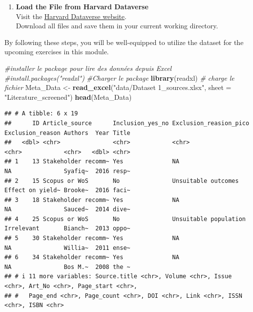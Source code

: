 \documentclass[
]{book}
\newenvironment{Shaded}{\begin{snugshade}}{\end{snugshade}}
\newcommand{\AttributeTok}[1]{\textcolor[rgb]{0.13,0.29,0.53}{#1}}
\newcommand{\CommentTok}[1]{\textcolor[rgb]{0.56,0.35,0.01}{\textit{#1}}}
\newcommand{\FunctionTok}[1]{\textcolor[rgb]{0.13,0.29,0.53}{\textbf{#1}}}
\newcommand{\NormalTok}[1]{#1}
\newcommand{\OtherTok}[1]{\textcolor[rgb]{0.56,0.35,0.01}{#1}}
\newcommand{\StringTok}[1]{\textcolor[rgb]{0.31,0.60,0.02}{#1}}
\providecommand{\tightlist}{%
  \setlength{\itemsep}{0pt}\setlength{\parskip}{0pt}}
\begin{document}
\begin{enumerate}
\def\labelenumi{\arabic{enumi}.}
\tightlist
\item
  \textbf{Load the File from Harvard Dataverse}\\
  Visit the \href{https://dataverse.harvard.edu/dataset.xhtml?persistentId=doi:10.7910/DVN/XIDI1X}{Harvard Dataverse website}.\\
  Download all files and save them in your current working directory.
\end{enumerate}

By following these steps, you will be well-equipped to utilize the dataset for the upcoming exercises in this module.\\

\begin{Shaded}
\begin{Highlighting}[]
\CommentTok{\#installer le package pour lire des données depuis Excel}
\CommentTok{\#install.packages("readxl")}
\CommentTok{\#Charger le package}
\FunctionTok{library}\NormalTok{(readxl)}
\CommentTok{\# charge le fichier}
\NormalTok{Meta\_Data }\OtherTok{\textless{}{-}} \FunctionTok{read\_excel}\NormalTok{(}\StringTok{"data/Dataset 1\_sources.xlsx"}\NormalTok{, }\AttributeTok{sheet =} \StringTok{"Literature\_screened"}\NormalTok{)}
\FunctionTok{head}\NormalTok{(Meta\_Data)}
\end{Highlighting}
\end{Shaded}

\begin{verbatim}
## # A tibble: 6 x 19
##      ID Article_source      Inclusion_yes_no Exclusion_reasion_pico Exclusion_reason Authors  Year Title
##   <dbl> <chr>               <chr>            <chr>                  <chr>            <chr>   <dbl> <chr>
## 1    13 Stakeholder recomm~ Yes              NA                     NA               Syafiq~  2016 resp~
## 2    15 Scopus or WoS       No               Unsuitable outcomes    Effect on yield~ Brooke~  2016 faci~
## 3    18 Stakeholder recomm~ Yes              NA                     NA               Sauced~  2014 dive~
## 4    25 Scopus or WoS       No               Unsuitable population  Irrelevant       Bianch~  2013 oppo~
## 5    30 Stakeholder recomm~ Yes              NA                     NA               Willia~  2011 ense~
## 6    34 Stakeholder recomm~ Yes              NA                     NA               Bos M.~  2008 the ~
## # i 11 more variables: Source.title <chr>, Volume <chr>, Issue <chr>, Art_No <chr>, Page_start <chr>,
## #   Page_end <chr>, Page_count <chr>, DOI <chr>, Link <chr>, ISSN <chr>, ISBN <chr>
\end{verbatim}
\end{document}
